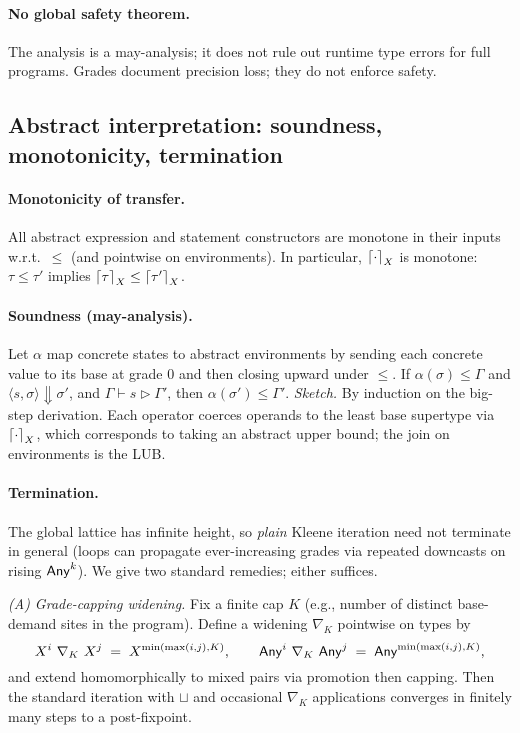 \paragraph{No global safety theorem.}
The analysis is a may-analysis; it does not rule out runtime type errors for full programs. Grades document precision loss; they do not enforce safety.

\subsection{Abstract interpretation: soundness, monotonicity, termination}

\paragraph{Monotonicity of transfer.}
All abstract expression and statement constructors are monotone in their inputs w.r.t.\ $\le$ (and pointwise on environments). In particular, $\left\lceil \cdot \right\rceil_X$ is monotone: $\tau\le\tau'$ implies $\left\lceil \tau \right\rceil_X \le \left\lceil \tau' \right\rceil_X$.

\paragraph{Soundness (may-analysis).}
Let $\alpha$ map concrete states to abstract environments by sending each concrete value to its base at grade $0$ and then closing upward under $\le$.
If $\alpha(\sigma)\le \Gamma$ and $\langle s,\sigma\rangle \Downarrow \sigma'$, and $\Gamma \vdash s \triangleright \Gamma'$, then $\alpha(\sigma') \le \Gamma'$.
\emph{Sketch.} By induction on the big-step derivation. Each operator coerces operands to the least base supertype via $\left\lceil \cdot \right\rceil_X$, which corresponds to taking an abstract upper bound; the join on environments is the LUB.

\paragraph{Termination.}
The global lattice has infinite height, so \emph{plain} Kleene iteration need not terminate in general (loops can propagate ever-increasing grades via repeated downcasts on rising $\mathsf{Any}^{k}$).
We give two standard remedies; either suffices.

\smallskip
\noindent\emph{(A) Grade-capping widening.}
Fix a finite cap $K$ (e.g., number of distinct base-demand sites in the program).
Define a widening $\nabla_K$ pointwise on types by
\[
X^{i}\ \nabla_K\ X^{j} \;=\; X^{\min(\max(i,j),K)},\qquad
\Any^{i}\ \nabla_K\ \Any^{j} \;=\; \Any^{\min(\max(i,j),K)},
\]
and extend homomorphically to mixed pairs via promotion then capping. Then the standard iteration with $\sqcup$ and occasional $\nabla_K$ applications converges in finitely many steps to a post-fixpoint.

